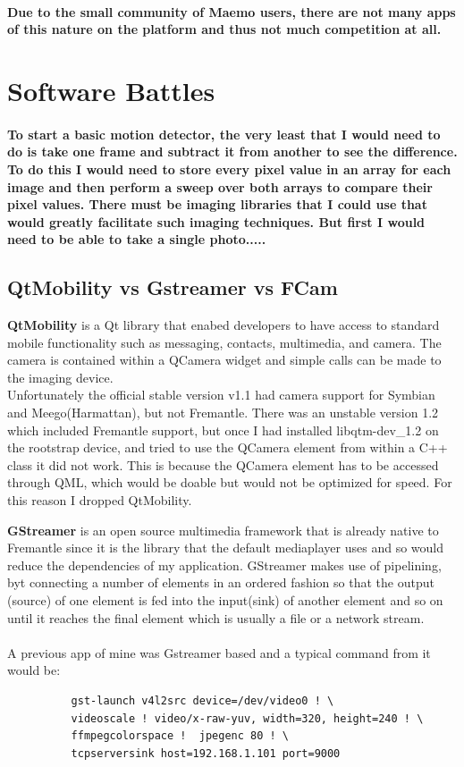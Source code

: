 \paragraph{Due to the small community of Maemo users, there are not many apps of this nature on the platform and thus not much competition at all.}

\section{Software Battles}
\paragraph{To start a basic motion detector, the very least that I would need to do is take one frame and subtract it from another to see the difference. To do this I would need to store every pixel value in an array for each image and then perform a sweep over both arrays to compare their pixel values. There must be imaging libraries that I could use that would greatly facilitate such imaging techniques. But first I would need to be able to take a single photo.....}

\subsection{QtMobility vs Gstreamer vs FCam}

{\bf QtMobility} is a Qt library that enabed developers to have access to standard mobile functionality such as messaging, contacts, multimedia, and camera.  The camera is contained within a QCamera widget and simple calls can be made to the imaging device.
\\Unfortunately the official stable version v1.1 had camera support for Symbian and Meego(Harmattan), but not Fremantle. There was an unstable version 1.2 which included Fremantle support, but once I had installed libqtm-dev\_1.2 on the rootstrap device, and tried to use the QCamera element from within a C++ class it did not work. This is because the QCamera element has to be accessed through QML, which would be doable but would not be optimized for speed. For this reason I dropped QtMobility.

{\bf GStreamer} is an open source multimedia framework that is already native to Fremantle since it is the library that the default mediaplayer uses and so would reduce the dependencies of my application. GStreamer makes use of pipelining, byt connecting a number of elements in an ordered fashion so that the output (source) of one element is fed into the input(sink) of another element and so on until it reaches the final element which is usually a file or a network stream.
\\\\A previous app of mine was Gstreamer based and a typical command from it would be:
\label{gstreamer}
\begin{verbatim}
	      gst-launch v4l2src device=/dev/video0 ! \
	      videoscale ! video/x-raw-yuv, width=320, height=240 ! \
	      ffmpegcolorspace !  jpegenc 80 ! \
	      tcpserversink host=192.168.1.101 port=9000
\end{verbatim}

